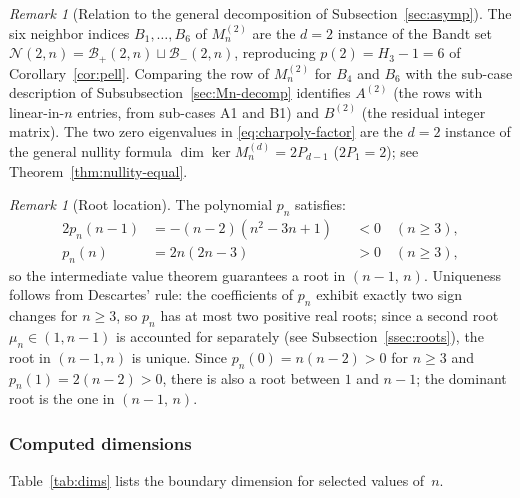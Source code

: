 \documentclass{amsart}
\theoremstyle{definition}
\theoremstyle{remark}
\newtheorem{remark}[theorem]{Remark}
\begin{document}
\begin{remark}[Relation to the general decomposition of Subsection~\ref{sec:asymp}]
\label{rem:quartic-link}
The six neighbor indices $B_1, \ldots, B_6$ of $M_n^{(2)}$ are the
$d = 2$ instance of the Bandt set
$\mathcal{N}(2, n) = \mathcal{B}_+(2, n) \sqcup \mathcal{B}_-(2, n)$,
reproducing $p(2) = H_3 - 1 = 6$ of
Corollary~\ref{cor:pell}.  Comparing the row of
$M_n^{(2)}$ for $B_4$ and $B_6$ with the sub-case description of
Subsubsection~\ref{sec:Mn-decomp} identifies $A^{(2)}$ (the rows with
linear-in-$n$ entries, from sub-cases A1 and B1) and $B^{(2)}$
(the residual integer matrix).  The two zero eigenvalues in
\eqref{eq:charpoly-factor} are the $d = 2$ instance of the
general nullity formula $\dim\ker M_n^{(d)} = 2 P_{d-1}$
\textup{(}$2 P_1 = 2$\textup{)}; see
Theorem~\ref{thm:nullity-equal}.
\end{remark}

\begin{remark}[Root location]
The polynomial $p_n$ satisfies:
\begin{alignat*}{2}
  p_n(n{-}1) &= -(n{-}2)(n^2{-}3n{+}1) &&< 0 \quad (n \ge 3), \\
  p_n(n)     &= 2n(2n{-}3)              &&> 0 \quad (n \ge 3),
\end{alignat*}
so the intermediate value theorem guarantees a root in $(n{-}1,\,n)$.
Uniqueness follows from Descartes' rule: the coefficients of $p_n$ exhibit
exactly two sign changes for $n \ge 3$, so $p_n$ has at most two positive
real roots; since a second root $\mu_n \in (1,n{-}1)$ is accounted for
separately (see Subsection~\ref{ssec:roots}), the root in $(n{-}1,n)$ is unique.
Since $p_n(0) = n(n{-}2) > 0$ for $n \ge 3$ and $p_n(1) = 2(n{-}2) > 0$,
there is also a root between $1$ and $n{-}1$; the dominant root is the
one in $(n{-}1,\,n)$.
\end{remark}

\subsubsection{Computed dimensions}

Table~\ref{tab:dims} lists the boundary dimension for selected values
of~$n$.
\end{document}
